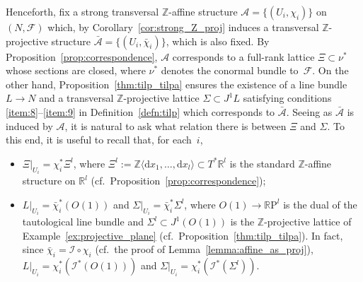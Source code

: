 \documentclass[pdftex]{sigma}
\numberwithin{equation}{section}
\newcommand{\de}{\mathrm{d}} %
\newcommand{\RR}{\mathbb{R}}
\newcommand{\ZZ}{\mathbb{Z}}
\begin{document}
Henceforth, f\/ix a strong transversal $\ZZ$-af\/f\/ine structure $\mathcal{A}=\{(U_i,\chi_i)\}$ on $(N,\mathcal{F})$ which, by Corollary~\ref{cor:strong_Z_proj} induces a transversal $\ZZ$-projective structure $\bar{\mathcal{A}} = \{(U_i,\bar{\chi}_i)\}$, which is also f\/ixed. By Proposition~\ref{prop:correspondence}, $\mathcal{A}$ corresponds to a full-rank lattice $\Xi \subset \nu^*$ whose sections are closed, where $\nu^*$ denotes the conormal bundle to~$\mathcal{F}$. On the other hand, Proposition~\ref{thm:tilp_tilpa} ensures the existence of a line bundle $L \to N$ and a transversal
$\ZZ$-projective lattice $\Sigma \subset J^1L$ satisfying conditions \ref{item:8}--\ref{item:9} in Def\/inition~\ref{defn:tilp} which corresponds to $\bar{\mathcal{A}}$. Seeing as $\bar{\mathcal{A}}$ is induced by $\mathcal{A}$, it is natural to ask what relation there is between $\Xi$ and $\Sigma$. To this end, it is useful to recall that, for each~$i$,
\begin{itemize}\itemsep=0pt
\item $\Xi|_{U_i}= \chi_i^* \Xi^l$, where $\Xi^l:=\ZZ \langle \de x_1,\ldots , \de x_l \rangle \subset T^* \RR^l$ is the standard $\ZZ$-af\/f\/ine structure on $\RR^l$ (cf.\ Proposition~\ref{prop:correspondence});
\item $L|_{U_i} = \bar{\chi}_i^*(O(1))$ and $\Sigma|_{U_i} = \bar{\chi}_i^* \Sigma^l$, where $O(1) \to \RR\mathrm{P}^l$ is the dual of the tautological line bundle and $\Sigma^l \subset J^1(O(1))$ is the $\ZZ$-projective lattice of Example~\ref{ex:projective_plane} (cf.\ Proposition~\ref{thm:tilp_tilpa}). In fact, since $\bar{\chi}_i = \mathcal{I} \circ \chi_i$ (cf.\ the proof of Lemma~\ref{lemma:affine_as_proj}), $L|_{U_i} = \chi^*_i(\mathcal{I}^*(O(1)))$ and $\Sigma|_{U_i} = \chi^*_i(\mathcal{I}^*(\Sigma^l))$.
\end{itemize}
\end{document}

